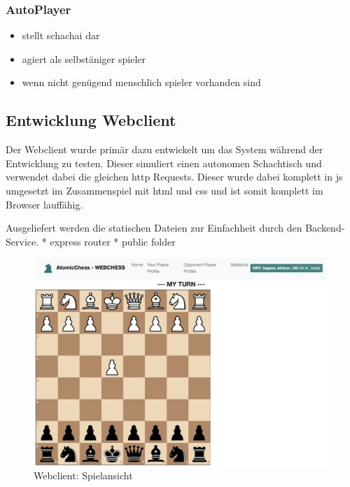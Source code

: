 \hypertarget{autoplayer}{%
\subsubsection{AutoPlayer}\label{autoplayer}}

\begin{itemize}
\tightlist
\item
  stellt schachai dar
\item
  agiert als selbstäniger spieler
\item
  wenn nicht genügend menschlich spieler vorhanden sind
\end{itemize}

\hypertarget{entwicklung-webclient}{%
\subsection{Entwicklung Webclient}\label{entwicklung-webclient}}

Der Webclient wurde primär dazu entwickelt um das System während der
Entwicklung zu testen. Dieser simuliert einen autonomen Schachtisch und
verwendet dabei die gleichen \gls{http} Requests. Dieser wurde dabei
komplett in \gls{js} umgesetzt im Zusammenspiel mit \gls{html} und
\gls{css} und ist somit komplett im Browser lauffähig.

Ausgeliefert werden die statischen Dateien zur Einfachheit durch den
Backend-Service. * express router * public folder

\begin{figure}
\centering
\includegraphics{images/ATC_webclient.png}
\caption{Webclient: Spielansicht}
\end{figure}

